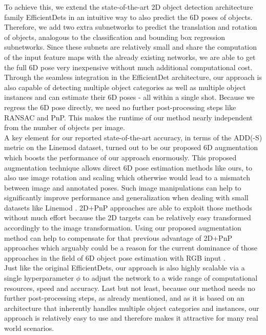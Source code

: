 \documentclass[twocolumn, 10pt, letterpaper]{article}
\begin{document}
To achieve this, we extend the state-of-the-art 2D object detection architecture family EfficientDets in an intuitive way to also predict the 6D poses of objects. Therefore, we add two extra subnetworks to predict the translation and rotation of objects, analogous to the classification and bounding box regression subnetworks. Since these subnets are relatively small and share the computation of the input feature maps with the already existing networks, we are able to get the full 6D pose very inexpensive without much additional computational cost.
Through the seamless integration in the EfficientDet architecture, our approach is also capable of detecting multiple object categories as well as multiple object instances and can estimate their 6D poses - all within a single shot. Because we regress the 6D pose directly, we need no further post-processing steps like RANSAC and PnP. This makes the runtime of our method nearly independent from the number of objects per image.\\
A key element for our reported state-of-the-art accuracy, in terms of the ADD(-S) metric on the Linemod dataset, turned out to be our proposed 6D augmentation which boosts the performance of our approach enormously. This proposed augmentation technique allows direct 6D pose estimation methods like ours, to also use image rotation and scaling which otherwise would lead to a mismatch between image and annotated poses. Such image manipulations can help to significantly improve performance and generalization when dealing with small datasets like Linemod \cite{RandAugment}\cite{AmoebaNet_NAS_FPN}. 2D+PnP approaches are able to exploit those methods without much effort because the 2D targets can be relatively easy transformed accordingly to the image transformation. Using our proposed augmentation method can help to compensate for that previous advantage of 2D+PnP approaches which arguably could be a reason for the current dominance of those approaches in the field of 6D object pose estimation with RGB input \cite{PVNet}\cite{DPOD}\cite{HybridPose}.\\
Just like the original EfficientDets, our approach is also highly scalable via a single hyperparameter $\phi$ to adjust the network to a wide range of computational resources, speed and accuracy.
Last but not least, because our method needs no further post-processing steps, as already mentioned, and as it is based on an architecture that inherently handles multiple object categories and instances, our approach is relatively easy to use and therefore makes it attractive for many real world scenarios.\\
\end{document}
